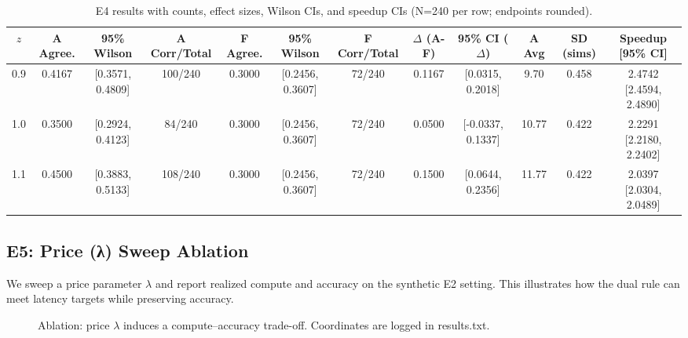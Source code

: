 \begin{table}[H]
  \centering
  \caption{E4 results with counts, effect sizes, Wilson CIs, and speedup CIs (N=240 per row; endpoints rounded).}
  \vspace{0.25em}
  \begin{adjustbox}{width=\linewidth}
  \begin{tabular}{c c c c c c c c c c c c}
    \toprule
    $z$ & A Agree. & 95\% Wilson & A Corr/Total & F Agree. & 95\% Wilson & F Corr/Total & $\Delta$ (A-F) & 95\% CI ($\Delta$) & A Avg & SD (sims) & Speedup [95\% CI] \\
    \midrule
    0.9 & 0.4167 & [0.3571, 0.4809] & 100/240 & 0.3000 & [0.2456, 0.3607] & 72/240 & 0.1167 & [0.0315, 0.2018] & 9.70 & 0.458 & 2.4742 [2.4594, 2.4890] \\
    1.0 & 0.3500 & [0.2924, 0.4123] & 84/240  & 0.3000 & [0.2456, 0.3607] & 72/240 & 0.0500 & [-0.0337, 0.1337] & 10.77 & 0.422 & 2.2291 [2.2180, 2.2402] \\
    1.1 & 0.4500 & [0.3883, 0.5133] & 108/240 & 0.3000 & [0.2456, 0.3607] & 72/240 & 0.1500 & [0.0644, 0.2356] & 11.77 & 0.422 & 2.0397 [2.0304, 2.0489] \\
    \bottomrule
  \end{tabular}
  \end{adjustbox}
\end{table}

\subsection{E5: Price (λ) Sweep Ablation}
We sweep a price parameter $\lambda$ and report realized compute and accuracy on the synthetic E2 setting. This illustrates how the dual rule can meet latency targets while preserving accuracy.
\begin{figure}[H]
  \centering
  \begin{adjustbox}{width=\linewidth}
  \end{adjustbox}
  \caption{Ablation: price $\lambda$ induces a compute--accuracy trade-off. Coordinates are logged in results.txt.}
  \label{fig:ablation}
\end{figure}

